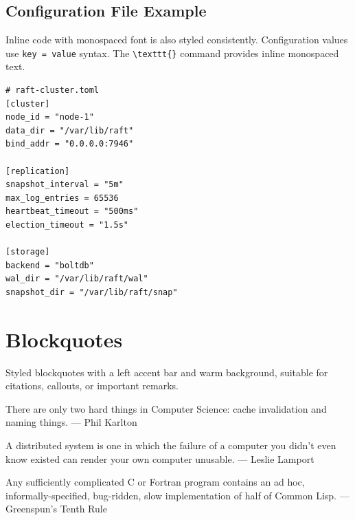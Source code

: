 \documentclass[12pt]{article}
\begin{document}
\subsection{Configuration File Example}
Inline code with monospaced font is also styled consistently.
Configuration values use \texttt{key = value} syntax.
The \texttt{\textbackslash texttt\{\}} command provides inline
monospaced text.

\begin{lstlisting}[language={}, caption={Cluster configuration file}]
# raft-cluster.toml
[cluster]
node_id = "node-1"
data_dir = "/var/lib/raft"
bind_addr = "0.0.0.0:7946"

[replication]
snapshot_interval = "5m"
max_log_entries = 65536
heartbeat_timeout = "500ms"
election_timeout = "1.5s"

[storage]
backend = "boltdb"
wal_dir = "/var/lib/raft/wal"
snapshot_dir = "/var/lib/raft/snap"
\end{lstlisting}

\section{Blockquotes}

Styled blockquotes with a left accent bar and warm background,
suitable for citations, callouts, or important remarks.

\begin{blockquote}
There are only two hard things in Computer Science: cache invalidation
and naming things. --- Phil Karlton
\end{blockquote}

\vspace{6pt}

\begin{blockquote}
A distributed system is one in which the failure of a computer you
didn't even know existed can render your own computer unusable.
--- Leslie Lamport
\end{blockquote}

\vspace{6pt}

\begin{blockquote}
Any sufficiently complicated C or Fortran program contains an ad hoc,
informally-specified, bug-ridden, slow implementation of half of
Common Lisp. --- Greenspun's Tenth Rule
\end{blockquote}
\end{document}

